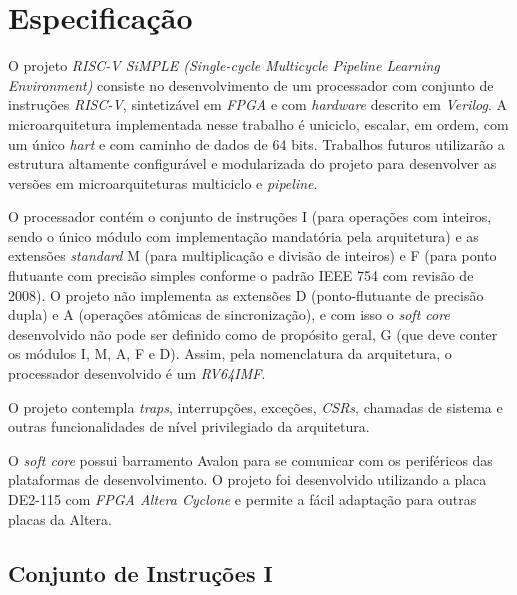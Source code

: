 \chapter{Especificação}

\label{CapSpecs}


    {O projeto \textit{RISC-V SiMPLE (Single-cycle Multicycle Pipeline Learning Environment)} consiste no desenvolvimento de um processador com conjunto de instruções \textit{RISC-V}, sintetizável em \textit{FPGA} e com \textit{hardware} descrito em \textit{Verilog}. A microarquitetura implementada nesse trabalho é uniciclo, escalar, em ordem, com um único \textit{hart} e com caminho de dados de 64 bits. Trabalhos futuros utilizarão a estrutura altamente configurável e modularizada do projeto para desenvolver as versões em microarquiteturas multiciclo e \textit{pipeline}.}

    {O processador contém o conjunto de instruções I (para operações com inteiros, sendo o único módulo com implementação mandatória pela arquitetura) e as extensões \textit{standard} M (para multiplicação e divisão de inteiros) e F (para ponto flutuante com precisão simples conforme o padrão IEEE 754 com revisão de 2008). O projeto não implementa as extensões D (ponto-flutuante de precisão dupla) e A (operações atômicas de sincronização), e com isso o \textit{soft core} desenvolvido não pode ser definido como de propósito geral, G (que deve conter os módulos I, M, A, F e D). Assim, pela nomenclatura da arquitetura, o processador desenvolvido é um \textit{RV64IMF}.}

    {O projeto contempla \textit{traps}, interrupções, exceções, \textit{CSRs}, chamadas de sistema e outras funcionalidades de nível privilegiado da arquitetura.}

    {O \textit{soft core} possui barramento Avalon para se comunicar com os periféricos das plataformas de desenvolvimento. O projeto foi desenvolvido utilizando a placa DE2-115 com \textit{FPGA Altera Cyclone} e permite a fácil adaptação para outras placas da Altera.}


    \section{Conjunto de Instruções I}
        {}

